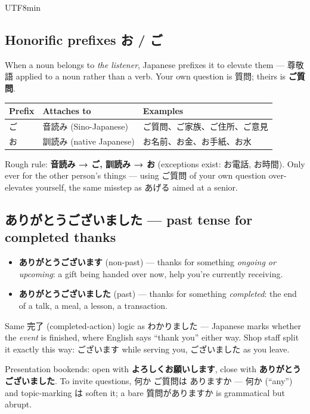 \documentclass[11pt]{article}
\begin{document}
\begin{CJK}{UTF8}{min}
\subsection{Honorific prefixes \texorpdfstring{お}{o} / \texorpdfstring{ご}{go}}
When a noun belongs to \emph{the listener}, Japanese prefixes it to elevate them
--- 尊敬語 applied to a noun rather than a verb. Your own question is 質問;
theirs is \textbf{ご質問}.

\begin{center}
\begin{tabular}{@{}lll@{}}
\toprule
Prefix & Attaches to & Examples \\
\midrule
ご & 音読み (Sino-Japanese) & ご質問、ご家族、ご住所、ご意見 \\
お & 訓読み (native Japanese) & お名前、お金、お手紙、お水 \\
\bottomrule
\end{tabular}
\end{center}

Rough rule: \textbf{音読み → ご, 訓読み → お} (exceptions exist: お電話, お時間).
Only ever for the other person's things --- using ご質問 of your own question
over-elevates yourself, the same misstep as あげる aimed at a senior.

\subsection{\texorpdfstring{ありがとうございました}{arigatou gozaimashita} --- past tense for completed thanks}
\begin{itemize}
  \item \textbf{ありがとうございます} (non-past) --- thanks for something
    \emph{ongoing or upcoming}: a gift being handed over now, help you're
    currently receiving.
  \item \textbf{ありがとうございました} (past) --- thanks for something
    \emph{completed}: the end of a talk, a meal, a lesson, a transaction.
\end{itemize}

Same 完了 (completed-action) logic as わかりました --- Japanese marks whether the
\emph{event} is finished, where English says ``thank you'' either way. Shop staff
split it exactly this way: ございます while serving you, ございました as you leave.

Presentation bookends: open with \textbf{よろしくお願いします}, close with
\textbf{ありがとうございました}. To invite questions, 何か ご質問は ありますか
--- 何か (``any'') and topic-marking は soften it; a bare 質問がありますか is
grammatical but abrupt.


\end{CJK}
\end{document}
